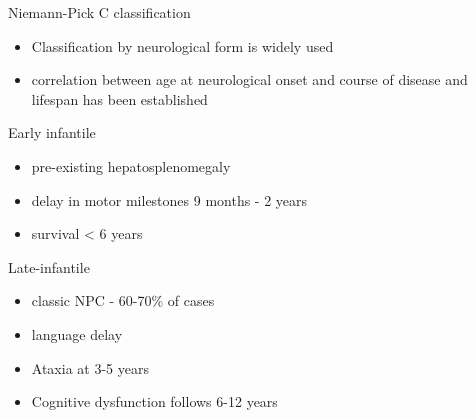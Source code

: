 \documentclass[presentation, smaller]{beamer}
\begin{document}
\begin{frame}[label={sec:orgheadline13}]{Niemann-Pick C classification}
\begin{itemize}
\item Classification by neurological form is widely used
\item correlation between age at neurological onset and course of disease
and lifespan has been established
\end{itemize}

\begin{block}{Early infantile}
\begin{itemize}
\item pre-existing hepatosplenomegaly
\item delay in motor milestones 9 months - 2 years
\item survival < 6 years
\end{itemize}
\end{block}

\begin{block}{Late-infantile}
\begin{itemize}
\item classic NPC - 60-70\% of cases
\item language delay
\item Ataxia at 3-5 years
\item Cognitive dysfunction follows 6-12 years
\end{itemize}
\end{block}
\end{frame}
\end{document}
